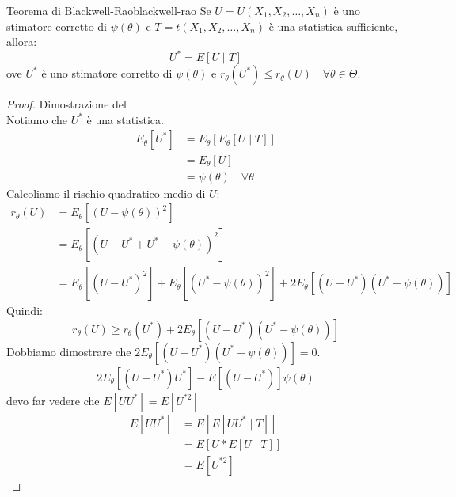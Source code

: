 \documentclass[12pt]{report}
\newcounter{theorem}
\newcommand{\namerefl}[1]{%
	\bgroup
	\let\nmu\MakeLowercase
	\nameref{#1}\egroup}
\newcommand{\nmu}{}
\begin{document}
 		\begin{theorem}{\nmu Teorema di Blackwell-Rao}{blackwell-rao}
 			Se $U = U(X_1, X_2, \dots, X_n)$ è uno stimatore corretto di $\psi(\theta)$ e $T= t(X_1, X_2, \dots, X_n)$ è una statistica sufficiente, allora:
 			\[
 			U^* = E[U \mid T]
 			\]
 			ove $U^*$ è uno stimatore corretto di $\psi(\theta)$ e $r_\theta(U^*) \leq r_\theta(U) \quad \forall \theta \in \Theta$.
 		\end{theorem}
 		\begin{proof}{\nmu Dimostrazione del \namerefl{th:blackwell-rao}} \quad \\
 			Notiamo che $U^*$ è una statistica. \\
 			\begin{align*}
 				E_\theta[U^*] &= E_\theta[E_\theta[U \mid T]] \\
 				&= E_\theta[U] \\
 				&= \psi(\theta) \quad \forall \theta
 			\end{align*}
 			Calcoliamo il rischio quadratico medio di $U$:
 			\begin{align*}
 				r_\theta(U) &= E_\theta[(U - \psi(\theta))^2] \\
 				&= E_\theta[(U - U^* + U^* - \psi(\theta))^2] \\
 				&= E_\theta[(U - U^*)^2] + E_\theta[(U^* - \psi(\theta))^2] + 2E_\theta[(U - U^*)(U^* - \psi(\theta))]
 			\end{align*}
 			Quindi:
 			\[
 			r_\theta(U) \geq r_\theta(U^*) + 2E_\theta[(U - U^*)(U^* - \psi(\theta))]
 			\]
 			Dobbiamo dimostrare che $2E_\theta[(U - U^*)(U^* - \psi(\theta))]=0$.
 			\begin{align*}
 				2E_\theta[(U - U^*)U^*] - E[(U - U^*)]\psi(\theta)
 			\end{align*}
 			devo far vedere che $E[UU^*] = E[U^{*2}]$ \\
 			\begin{align*}
 				E[UU^*] &= E[E[UU^* \mid T]] \\
 				&= E[U*E[U \mid T]] \\
 				&= E[U^{*2}]
 			\end{align*}
 		\end{proof}
\end{document}
